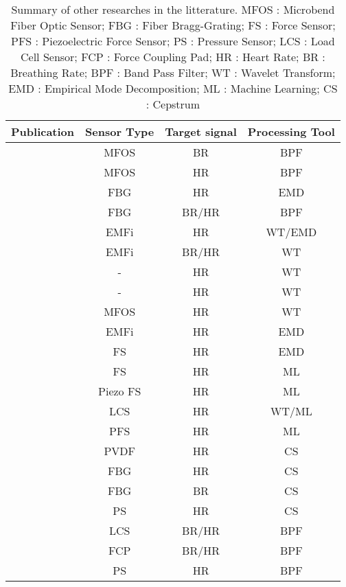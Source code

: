 \documentclass[twoside,onecolumn]{article}
\begin{document}
{
\begin{table}
\centering
 \begin{tabular}{||c c c c||} 
 \hline
 Publication & Sensor Type & Target signal & Processing Tool \\ [0.5ex] 
 \hline\hline
 \cite{lau_intensity-modulated_2013} &	MFOS & BR & BPF \\
 \hline
 \cite{chen_portable_2012}	& MFOS & HR & BPF \\
 \hline
 \cite{sadek_automatic_2015} & FBG & HR & EMD \\
 \hline
 \cite{dziuda_monitoring_2012} & FBG & BR/HR & BPF \\
 \hline
 \cite{pino_noninvasive_2015} & EMFi & HR & WT/EMD \\
 \hline 
 \cite{postolache_vital_2007} & EMFi & BR/HR & WT \\
 \hline
 \cite{jin_novel_2009} & - & HR & WT \\
 \hline
 \cite{deliere_ballistocardiogram_2015} & - & HR & WT \\
 \hline
 \cite{sadek_continuous_2017} & MFOS & HR & WT \\
 \hline
 \cite{pinheiro_online_2010} & EMFi & HR & EMD \\
 \hline
 \cite{song_extracting_2015} & FS & HR & EMD \\
 \hline
 \cite{bruser_adaptive_2011} & FS & HR & ML \\
 \hline
 \cite{paalasmaa_detecting_2008} & Piezo FS & HR & ML \\
 \hline
 \cite{noh_development_2010} & LCS & HR & WT/ML \\
 \hline
 \cite{katz_contact-free_2016} & PFS & HR & ML \\
 \hline
 \cite{bruser_improvement_2015} & PVDF & HR & CS \\
 \hline
 \cite{zhu_heart_2014} & FBG & HR & CS \\
 \hline
 \cite{zhu_estimating_2015}	 & FBG & BR & CS \\
 \hline
 \cite{kortelainen_multichannel_2012} & PS & HR & CS \\
 \hline
 \cite{lee_ballistocardiogram_2015} & LCS & BR/HR & BPF \\
 \hline
 \cite{mack_development_2009} & FCP & BR/HR & BPF \\
 \hline
 \cite{lydon_robust_2015} & PS & HR & BPF \\
 \hline

\end{tabular}
\label{table:1}
\caption{Summary of other researches in the litterature. MFOS : Microbend Fiber Optic Sensor; FBG : Fiber Bragg-Grating; FS : Force Sensor; PFS : Piezoelectric Force Sensor; PS :  Pressure Sensor; LCS : Load Cell Sensor; FCP : Force Coupling Pad; HR : Heart Rate; BR : Breathing Rate; BPF : Band Pass Filter; WT : Wavelet Transform; EMD : Empirical Mode Decomposition; ML : Machine Learning; CS : Cepstrum}
\end{table}
}
\end{document}
